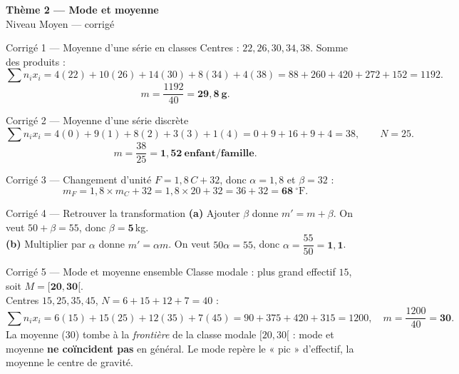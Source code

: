 \documentclass[11pt,a4paper]{article}
\newcommand{\bandeau}[2]{%
\begin{tcolorbox}[boxbase,colback=primary,colframe=primarydark,halign=center,
   before skip=2pt,after skip=12pt]
{\LARGE\bfseries\color{white} #1}\\[3pt]{\normalsize\color{white} #2}
\end{tcolorbox}}
\begin{document}
\bandeau{Thème 2 — Mode et moyenne}{Niveau Moyen — corrigé}

\begin{corbox}{Corrigé 1 — Moyenne d'une série en classes}
Centres : $22,26,30,34,38$. Somme des produits :
\[
\sum n_i x_i=4(22)+10(26)+14(30)+8(34)+4(38)=88+260+420+272+152=1192.
\]
\[ m=\frac{1192}{40}=\mathbf{29{,}8\ \text{g}}. \]
\end{corbox}

\begin{corbox}{Corrigé 2 — Moyenne d'une série discrète}
\[
\sum n_i x_i=4(0)+9(1)+8(2)+3(3)+1(4)=0+9+16+9+4=38,\qquad N=25.
\]
\[ m=\frac{38}{25}=\mathbf{1{,}52\ \text{enfant/famille}}. \]
\end{corbox}

\begin{corbox}{Corrigé 3 — Changement d'unité}
$F=1{,}8\,C+32$, donc $\alpha=1{,}8$ et $\beta=32$ :
\[ m_F=1{,}8\times m_C+32=1{,}8\times20+32=36+32=\mathbf{68\ ^\circ\mathrm{F}}. \]
\end{corbox}

\begin{corbox}{Corrigé 4 — Retrouver la transformation}
\textbf{(a)} Ajouter $\beta$ donne $m'=m+\beta$. On veut $50+\beta=55$, donc $\beta=\mathbf{5}$\,kg.\\[2pt]
\textbf{(b)} Multiplier par $\alpha$ donne $m'=\alpha m$. On veut $50\alpha=55$, donc
$\alpha=\dfrac{55}{50}=\mathbf{1{,}1}$.
\end{corbox}

\begin{corbox}{Corrigé 5 — Mode et moyenne ensemble}
Classe modale : plus grand effectif $15$, soit $M=\mathbf{[20,30[}$.\\
Centres $15,25,35,45$, $N=6+15+12+7=40$ :
\[
\sum n_i x_i=6(15)+15(25)+12(35)+7(45)=90+375+420+315=1200,\quad m=\frac{1200}{40}=\mathbf{30}.
\]
La moyenne ($30$) tombe à la \emph{frontière} de la classe modale $[20,30[$ : mode et moyenne
\textbf{ne coïncident pas} en général. Le mode repère le « pic » d'effectif, la moyenne le centre de gravité.
\end{corbox}
\end{document}
